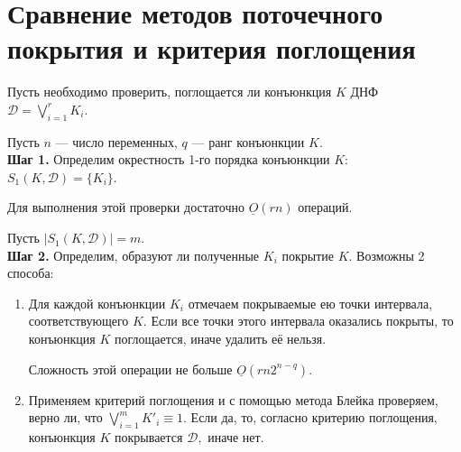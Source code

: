 \documentclass[12pt,a4paper,oneside,fleqn,leqno]{article}
\theoremstyle{definition}
\begin{document}
	\section{Сравнение методов поточечного покрытия и критерия поглощения}
		Пусть необходимо проверить, поглощается ли конъюнкция $K$ ДНФ $\mathcal{D} = \bigvee\limits_{i = 1}^r K_i.$\par
		Пусть $n$ --- число переменных, $q$ --- ранг конъюнкции $K.$\\
		\textbf{Шаг 1.} Определим окрестность 1-го порядка конъюнкции $K$: $S_1(K, \mathcal{D}) = \{K_i\}.$\par
		Для выполнения этой проверки достаточно $\underline{O}(rn)$ операций.\par
		Пусть $|S_1(K, \mathcal{D})| = m$.\\
		\textbf{Шаг 2.} Определим, образуют ли полученные $K_i$ покрытие $K.$ Возможны 2 способа:\par
		\begin{enumerate}
			\item
			Для каждой конъюнкции $K_i$ отмечаем покрываемые ею точки интервала, соответствующего $K.$ Если все точки этого интервала оказались покрыты, то конъюнкция $K$ поглощается, иначе удалить её нельзя.\par
			Сложность этой операции не больше $\underline{O}(rn2^{n-q})$.
			\item
			Применяем критерий поглощения и с помощью метода Блейка проверяем, верно ли, что $\bigvee\limits_{i = 1}^m K'_i \equiv 1.$ Если да, то, согласно критерию поглощения, конъюнкция $K$ покрывается $\mathcal{D},$ иначе нет.\par
		\end{enumerate}\par
\end{document}
